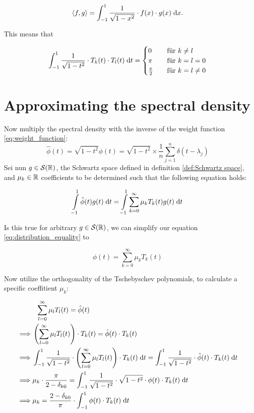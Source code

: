 \[
\left \langle f, g \right \rangle = \int_{-1}^1 \frac{1}{\sqrt{1 - x^2}} \cdot f(x) \cdot g(x) \;\mathrm{d}x.
\]

This means that

\[
\int_{-1}^1 \frac{1}{\sqrt{1 - t^2}} \cdot T_k(t) \cdot T_l(t) \;\mathrm{d}t =
\begin{cases}
    0               & \quad \text{für } k \neq l\\
    \pi             & \quad \text{für } k = l = 0\\
    \frac{\pi}{2}   & \quad \text{für } k = l \neq 0
\end{cases}
\]

\section{Approximating the spectral density}
Now multiply the spectral density with the inverse of the weight function \ref{eq:weight_function}:
\[
\hat{\phi}(t) = \sqrt{1 - t^2} \phi(t) = \sqrt{1 - t^2} \times \frac{1}{n} \sum_{j = 1}^n \delta(t - \lambda_j)
\]
Sei nun $g \in \mathcal{S}(\mathbb{R})$, the Schwartz space defined in definition \ref{def:Schwartz space},
and $\mu_k \in \mathbb{R}$ coefficients to be determined such that the following equation holds:

\begin{equation} \label{eq:distribution_equality}
    \int \limits_{-1}^1 \hat{\phi}(t) g(t) \;\mathrm{d}t = \int \limits_{-1}^1 \sum_{k = 0}^{\infty} \mu_k T_k(t) g(t) \;\mathrm{d}t
\end{equation}

Is this true for arbitrary $g \in \mathcal{S}(\mathbb{R})$, we can simplify our equation \ref{eq:distribution_equality} to

\begin{equation} \label{eq:Tschebyschev-Erweiterung}
    \hat{\phi}(t) = \sum_{k = 0}^{\infty} \mu_k T_k(t)
\end{equation}

Now utilize the orthogonality of the Tschebyschev polynomials, to calculate a specific coeffitient $\mu_k$:

\begin{align*}
    & \; \; \sum_{l = 0}^{\infty} \mu_l T_l(t) = \hat{\phi}(t) \\
    \implies & \left(\sum_{l = 0}^{\infty} \mu_l T_l(t)\right) \cdot T_k(t) = \hat{\phi}(t) \cdot T_k(t)\\
    \implies & \int_{-1}^1 \frac{1}{\sqrt{1 - t^2}} \cdot \left(\sum_{l = 0}^{\infty} \mu_l T_l(t)\right) \cdot T_k(t) \;\mathrm{d}t = \int_{-1}^1 \frac{1}{\sqrt{1 - t^2}} \cdot \hat{\phi}(t) \cdot T_k(t) \;\mathrm{d}t\\
    \implies & \mu_k \cdot \frac{\pi}{2 - \delta_{k0}} = \int_{-1}^1 \frac{1}{\sqrt{1 - t^2}} \cdot \sqrt{1 - t^2} \cdot \phi(t) \cdot T_k(t) \;\mathrm{d}t\\
    \implies & \mu_k = \frac{2 - \delta_{k0}}{\pi} \cdot \int_{-1}^1 \phi(t) \cdot T_k(t) \;\mathrm{d}t\\
\end{align*}

